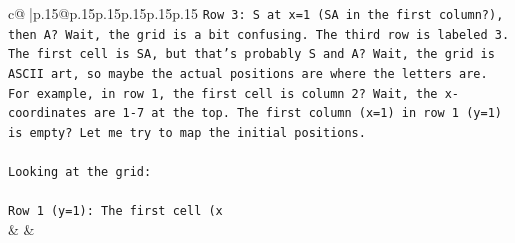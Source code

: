 \documentclass{article}
\begin{document}
{\begin{supertabular}{c@{$\;$}|p{.15\linewidth}@{}p{.15\linewidth}p{.15\linewidth}p{.15\linewidth}p{.15\linewidth}p{.15\linewidth}}
{{{\texttt{Row 3: S at x=1 (SA in the first column?), then A? Wait, the grid is a bit confusing. The third row is labeled 3. The first cell is SA, but that's probably S and A? Wait, the grid is ASCII art, so maybe the actual positions are where the letters are. For example, in row 1, the first cell is column 2? Wait, the x{-}coordinates are 1{-}7 at the top. The first column (x=1) in row 1 (y=1) is empty? Let me try to map the initial positions.} \\
\\ 
\texttt{Looking at the grid:} \\
\\ 
\texttt{Row 1 (y=1): The first cell (x} \\
            }
        }
    }
    & & \\ \\


\end{supertabular}}
\end{document}
